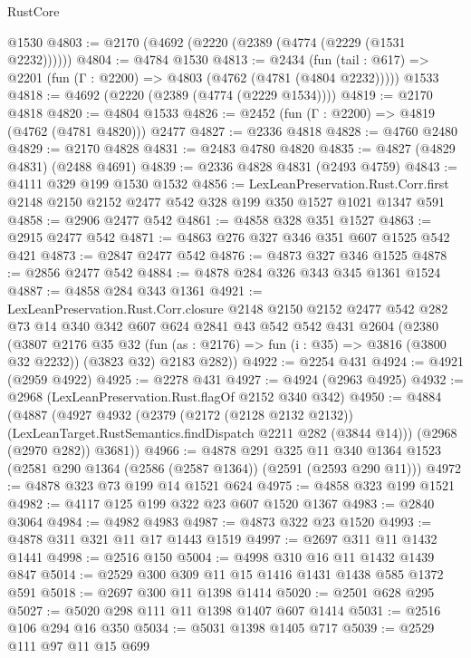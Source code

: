 \begin{lexlean}{RustCore}
\begin{coremodule}
    @1530
@4803 := @2170 (@4692 (@2220 (@2389 (@4774 (@2229 (@1531 @2232))))))
@4804 := @4784 @1530
@4813 := @2434
    (fun (tail : @617) => @2201 (fun (Γ : @2200) => @4803 (@4762 (@4781 (@4804 @2232)))))
    @1533
@4818 := @4692 (@2220 (@2389 (@4774 (@2229 @1534))))
@4819 := @2170 @4818
@4820 := @4804 @1533
@4826 := @2452 (fun (Γ : @2200) => @4819 (@4762 (@4781 @4820))) @2477
@4827 := @2336 @4818
@4828 := @4760 @2480
@4829 := @2170 @4828
@4831 := @2483 @4780 @4820
@4835 := @4827 (@4829 @4831) (@2488 @4691)
@4839 := @2336 @4828 @4831 (@2493 @4759)
@4843 := @4111 @329 @199 @1530 @1532
@4856 := LexLeanPreservation.Rust.Corr.first
    @2148
    @2150
    @2152
    @2477
    @542
    @328
    @199
    @350
    @1527
    @1021
    @1347
    @591
@4858 := @2906 @2477 @542
@4861 := @4858 @328 @351 @1527
@4863 := @2915 @2477 @542
@4871 := @4863 @276 @327 @346 @351 @607 @1525 @542 @421
@4873 := @2847 @2477 @542
@4876 := @4873 @327 @346 @1525
@4878 := @2856 @2477 @542
@4884 := @4878 @284 @326 @343 @345 @1361 @1524
@4887 := @4858 @284 @343 @1361
@4921 := LexLeanPreservation.Rust.Corr.closure
    @2148
    @2150
    @2152
    @2477
    @542
    @282
    @73
    @14
    @340
    @342
    @607
    @624
    @2841
    @43
    @542
    @542
    @431
    @2604
    (@2380
      (@3807
        @2176
        @35
        @32
        (fun (as : @2176) => fun (i : @35) => @3816 (@3800 @32 @2232))
        (@3823 @32)
        @2183
        @282))
@4922 := @2254 @431
@4924 := @4921 (@2959 @4922)
@4925 := @2278 @431
@4927 := @4924 (@2963 @4925)
@4932 := @2968 (LexLeanPreservation.Rust.flagOf @2152 @340 @342)
@4950 := @4884
    (@4887
      (@4927
        @4932
        (@2379
          (@2172 (@2128 @2132 @2132))
          (LexLeanTarget.RustSemantics.findDispatch @2211 @282 (@3844 @14)))
        (@2968 (@2970 @282))
        @3681))
@4966 := @4878
    @291
    @325
    @11
    @340
    @1364
    @1523
    (@2581 @290 @1364 (@2586 (@2587 @1364)) (@2591 (@2593 @290 @11)))
@4972 := @4878 @323 @73 @199 @14 @1521 @624
@4975 := @4858 @323 @199 @1521
@4982 := @4117 @125 @199 @322 @23 @607 @1520 @1367
@4983 := @2840 @3064
@4984 := @4982 @4983
@4987 := @4873 @322 @23 @1520
@4993 := @4878 @311 @321 @11 @17 @1443 @1519
@4997 := @2697 @311 @11 @1432 @1441
@4998 := @2516 @150
@5004 := @4998 @310 @16 @11 @1432 @1439 @847
@5014 := @2529 @300 @309 @11 @15 @1416 @1431 @1438 @585 @1372 @591
@5018 := @2697 @300 @11 @1398 @1414
@5020 := @2501 @628 @295
@5027 := @5020 @298 @111 @11 @1398 @1407 @607 @1414
@5031 := @2516 @106 @294 @16 @350
@5034 := @5031 @1398 @1405 @717
@5039 := @2529 @111 @97 @11 @15 @699

\end{coremodule}
\end{lexlean}
